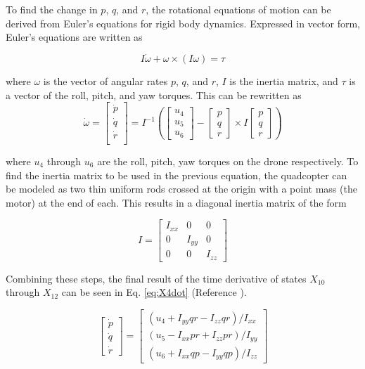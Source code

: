 \documentclass[letterpaper, paper,11pt]{AAS}	%
\begin{document}
To find the change in $p$, $q$, and $r$, the rotational equations of motion can be derived from Euler’s equations for rigid body dynamics. Expressed in vector form, Euler’s equations are written as

\[
I\dot{\omega}+\omega\times(I\omega)=\tau
\]

where $\omega$ is the vector of angular rates $p$, $q$, and $r$, $I$ is the inertia matrix, and $\tau$ is a vector of the roll, pitch, and yaw torques. This can be rewritten as
\[
\dot{\omega}=\begin{bmatrix}
\dot{p}\\
\dot{q}\\
\dot{r}\\
\end{bmatrix}=
I^{-1}\left(\begin{bmatrix}
u_4\\u_5\\u_6
\end{bmatrix}-
\begin{bmatrix}
p\\
q\\
r
\end{bmatrix}\times	I\begin{bmatrix}
p\\
q\\
r
\end{bmatrix}\right)
\]

where $u_4$ through $u_6$ are the roll, pitch, yaw torques on the drone respectively. To find the inertia matrix to be used in the previous equation, the quadcopter can be modeled as two thin uniform rods crossed at the origin with a point mass (the motor) at the end of each. This results in a diagonal inertia matrix of the form

\[
I = \begin{bmatrix}
I_{xx}&0&0\\
0&I_{yy}&0\\
0&0&I_{zz}
\end{bmatrix}
\]

Combining these steps, the final result of the time derivative of states $X_{10}$ through $X_{12}$ can be seen in Eq. \eqref{eq:X4dot} (Reference \cite{X4dot}).

\begin{equation}
\label{eq:X4dot}
\begin{bmatrix}
\dot{p}\\
\dot{q}\\
\dot{r}
\end{bmatrix}=
\begin{bmatrix}
(u_4 + I_{yy}qr - I_{zz}qr)/I_{xx}\\
(u_5 - I_{xx}pr + I_{zz}pr)/I_{yy}\\
(u_6 + I_{xx}qp - I_{yy}qp)/I_{zz}
\end{bmatrix}
\end{equation}
\end{document}
